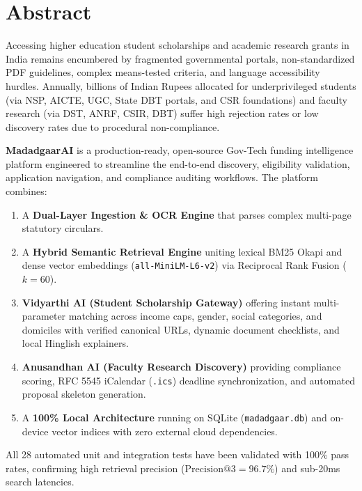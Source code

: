 \documentclass[12pt,a4paper]{article}
\begin{document}
\newpage
{}
\tableofcontents
\vspace{0.8cm}
\listoftables
\vspace{0.8cm}
\listoffigures
\newpage
{}
	
\section{Abstract}
Accessing higher education student scholarships and academic research grants in India remains encumbered by fragmented governmental portals, non-standardized PDF guidelines, complex means-tested criteria, and language accessibility hurdles. Annually, billions of Indian Rupees allocated for underprivileged students (via NSP, AICTE, UGC, State DBT portals, and CSR foundations) and faculty research (via DST, ANRF, CSIR, DBT) suffer high rejection rates or low discovery rates due to procedural non-compliance.

\textbf{MadadgaarAI} is a production-ready, open-source Gov-Tech funding intelligence platform engineered to streamline the end-to-end discovery, eligibility validation, application navigation, and compliance auditing workflows. The platform combines:
\begin{enumerate}[itemsep=2pt]
    \item A \textbf{Dual-Layer Ingestion \& OCR Engine} that parses complex multi-page statutory circulars.
    \item A \textbf{Hybrid Semantic Retrieval Engine} uniting lexical BM25 Okapi and dense vector embeddings (\texttt{all-MiniLM-L6-v2}) via Reciprocal Rank Fusion ($k=60$).
    \item \textbf{Vidyarthi AI (Student Scholarship Gateway)} offering instant multi-parameter matching across income caps, gender, social categories, and domiciles with verified canonical URLs, dynamic document checklists, and local Hinglish explainers.
    \item \textbf{Anusandhan AI (Faculty Research Discovery)} providing compliance scoring, RFC 5545 iCalendar (\texttt{.ics}) deadline synchronization, and automated proposal skeleton generation.
    \item A \textbf{100\% Local Architecture} running on SQLite (\texttt{madadgaar.db}) and on-device vector indices with zero external cloud dependencies.
\end{enumerate}
All 28 automated unit and integration tests have been validated with 100\% pass rates, confirming high retrieval precision ($\text{Precision@3} = 96.7\%$) and sub-20ms search latencies.
	
\end{document}
